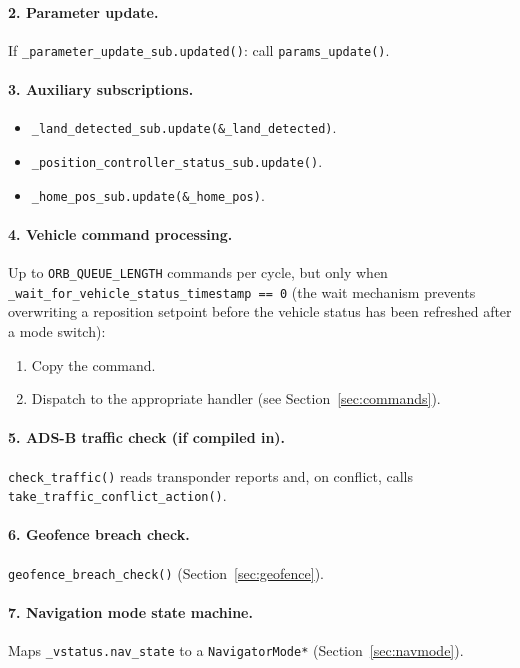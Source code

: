 \documentclass[12pt,a4paper]{article}
\begin{document}
\paragraph{2. Parameter update.}
If \texttt{\_parameter\_update\_sub.updated()}: call \texttt{params\_update()}.

\paragraph{3. Auxiliary subscriptions.}
\begin{itemize}
  \item \texttt{\_land\_detected\_sub.update(\&\_land\_detected)}.
  \item \texttt{\_position\_controller\_status\_sub.update()}.
  \item \texttt{\_home\_pos\_sub.update(\&\_home\_pos)}.
\end{itemize}

\paragraph{4. Vehicle command processing.}
Up to \texttt{ORB\_QUEUE\_LENGTH} commands per cycle, but only when
\texttt{\_wait\_for\_vehicle\_status\_timestamp == 0}
(the wait mechanism prevents overwriting a reposition setpoint before the
vehicle status has been refreshed after a mode switch):
\begin{enumerate}
  \item Copy the command.
  \item Dispatch to the appropriate handler (see Section~\ref{sec:commands}).
\end{enumerate}

\paragraph{5. ADS-B traffic check (if compiled in).}
\texttt{check\_traffic()} reads transponder reports and, on conflict,
calls \texttt{take\_traffic\_conflict\_action()}.

\paragraph{6. Geofence breach check.}
\texttt{geofence\_breach\_check()} (Section~\ref{sec:geofence}).

\paragraph{7. Navigation mode state machine.}
Maps \texttt{\_vstatus.nav\_state} to a \texttt{NavigatorMode*}
(Section~\ref{sec:navmode}).
\end{document}
